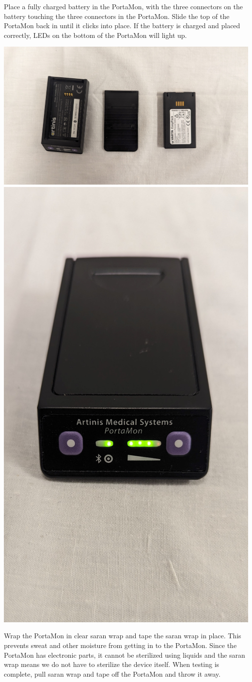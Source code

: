 \documentclass[
]{book}
\begin{document}
Place a fully charged battery in the PortaMon, with the three connectors on the battery touching the three connectors in the PortaMon. Slide the top of the PortaMon back in until it clicks into place. If the battery is charged and placed correctly, LEDs on the bottom of the PortaMon will light up.

\includegraphics[width=0.5\linewidth]{images/portamonandbattery}
\includegraphics[width=0.5\linewidth]{images/portamonon}

Wrap the PortaMon in clear saran wrap and tape the saran wrap in place. This prevents sweat and other moisture from getting in to the PortaMon. Since the PortaMon has electronic parts, it cannot be sterilized using liquids and the saran wrap means we do not have to sterilize the device itself. When testing is complete, pull saran wrap and tape off the PortaMon and throw it away.
\end{document}
